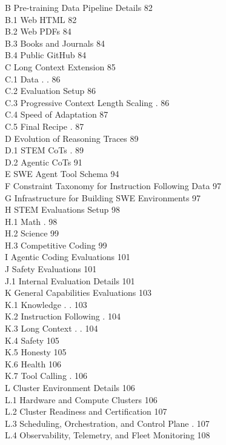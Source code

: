 B Pre-training Data Pipeline Details 82\\
B.1 Web HTML 82\\
B.2 Web PDFs 84\\
B.3 Books and Journals 84\\
B.4 Public GitHub 84\\
C Long Context Extension 85\\
C.1 Data . . 86\\
C.2 Evaluation Setup 86\\
C.3 Progressive Context Length Scaling . 86\\
C.4 Speed of Adaptation 87\\
C.5 Final Recipe . 87\\
D Evolution of Reasoning Traces 89\\
D.1 STEM CoTs . 89\\
D.2 Agentic CoTs 91\\
E SWE Agent Tool Schema 94\\
F Constraint Taxonomy for Instruction Following Data 97\\
G Infrastructure for Building SWE Environments 97\\
H STEM Evaluations Setup 98\\
H.1 Math . 98\\
H.2 Science 99\\
H.3 Competitive Coding 99\\
I Agentic Coding Evaluations 101\\
J Safety Evaluations 101\\
J.1 Internal Evaluation Details 101\\
K General Capabilities Evaluations 103\\
K.1 Knowledge . . 103\\
K.2 Instruction Following . 104\\
K.3 Long Context . . 104\\
K.4 Safety 105\\
K.5 Honesty 105\\
K.6 Health 106\\
K.7 Tool Calling . 106\\
L Cluster Environment Details 106\\
L.1 Hardware and Compute Clusters 106\\
L.2 Cluster Readiness and Certification 107\\
L.3 Scheduling, Orchestration, and Control Plane . 107\\
L.4 Observability, Telemetry, and Fleet Monitoring 108
